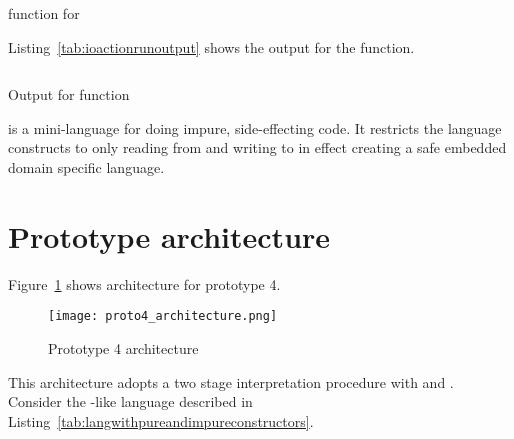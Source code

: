 \documentclass[thesis-solanki.tex]{subfiles}
\begin{document}
\begin{code-list}[H]
\begin{singlespace}
\inputminted{haskell}{haskell-proto4-ioaction-run.hs}
\end{singlespace}
\caption{ function for }
\label{tab:ioactionrun}
\end{code-list}

Listing~\ref{tab:ioactionrunoutput} shows the output for the  function.

\begin{code-list}[H]
\begin{singlespace}
\inputminted{haskell}{haskell-proto4-ioaction-run-output.hs}
\end{singlespace}
\caption{Output for  function}
\label{tab:ioactionrunoutput}
\end{code-list}

 is a mini-language for doing impure, side-effecting code.
It restricts the language constructs to only reading from  and writing to
 in effect creating a safe embedded domain specific language.

\begin{comment}
\begin{code-list}[H]
\begin{singlespace}
  \inputminted[linenos]{haskell}{haskell-proto4-purvey-wincer.hs}
\end{singlespace}
\caption{\protect\haskellConstruct{IOAction} definitions}
\label{lis:IOAction}
\end{code-list}
\end{comment}

\newpage

\section{Prototype architecture}
Figure~\ref{fig:proto4architecture} shows architecture for prototype 4.

\begin{figure}[H]
  \centering
  \texttt{[image: proto4\_architecture.png]}
  \caption{Prototype 4 architecture}
  \label{fig:proto4architecture}
\end{figure}

This architecture adopts a two stage interpretation procedure with  and . Consider the 
-like language described in Listing~\ref{tab:langwithpureandimpureconstructors}.
\end{document}
